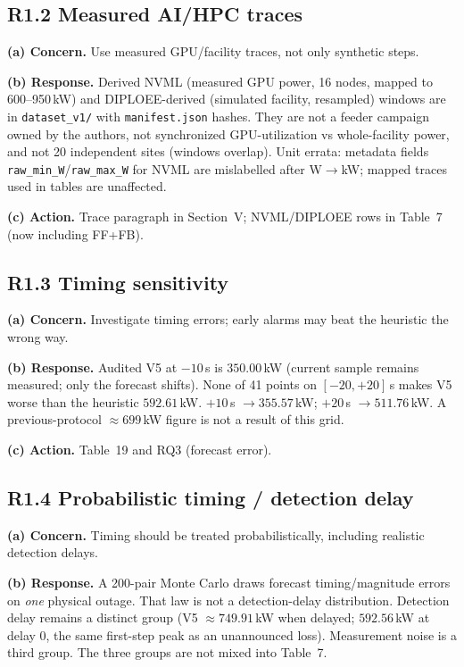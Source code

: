 \documentclass[11pt]{article}
\begin{document}
\subsection*{R1.2 Measured AI/HPC traces}
\textbf{(a) Concern.} Use measured GPU/facility traces, not only synthetic steps.

\textbf{(b) Response.} Derived NVML (measured GPU power, 16 nodes, mapped to 600--950\,kW) and DIPLOEE-derived (simulated facility, resampled) windows are in \texttt{dataset\_v1/} with \texttt{manifest.json} hashes. They are not a feeder campaign owned by the authors, not synchronized GPU-utilization vs whole-facility power, and not 20 independent sites (windows overlap). Unit errata: metadata fields \texttt{raw\_min\_W}/\texttt{raw\_max\_W} for NVML are mislabelled after W$\to$kW; mapped traces used in tables are unaffected.

\textbf{(c) Action.} Trace paragraph in Section~V; NVML/DIPLOEE rows in Table~7 (now including FF+FB).

\subsection*{R1.3 Timing sensitivity}
\textbf{(a) Concern.} Investigate timing errors; early alarms may beat the heuristic the wrong way.

\textbf{(b) Response.} Audited V5 at $-10$\,s is $350.00$\,kW (current sample remains measured; only the forecast shifts). None of 41 points on $[-20,+20]$\,s makes V5 worse than the heuristic $592.61$\,kW. $+10$\,s $\to 355.57$\,kW; $+20$\,s $\to 511.76$\,kW. A previous-protocol $\approx 699$\,kW figure is not a result of this grid.

\textbf{(c) Action.} Table~19 and RQ3 (forecast error).

\subsection*{R1.4 Probabilistic timing / detection delay}
\textbf{(a) Concern.} Timing should be treated probabilistically, including realistic detection delays.

\textbf{(b) Response.} A 200-pair Monte Carlo draws forecast timing/magnitude errors on \emph{one} physical outage. That law is not a detection-delay distribution. Detection delay remains a distinct group (V5 $\approx 749.91$\,kW when delayed; $592.56$\,kW at delay 0, the same first-step peak as an unannounced loss). Measurement noise is a third group. The three groups are not mixed into Table~7.
\end{document}
